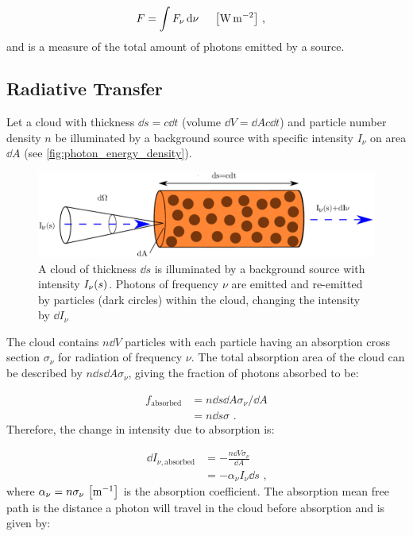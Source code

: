 \begin{equation}
	\begin{aligned}
		F&=\int F_\nu \dd{\nu}~\quad\qty[\si{\watt\per\meter\squared}]\text{ ,}
	\end{aligned}
\end{equation}
\noindent and is a measure of the total amount of photons emitted by a source.

\subsection{Radiative Transfer}

Let a cloud with thickness $\dd{s}=c\dd{t}$ (volume $\dd{V}=\dd{A}c\dd{t}$) and particle number density $n$ be illuminated by a background source with specific intensity $I_\nu$ on area $\dd{A}$ (see \autoref{fig:photon_energy_density}).

\begin{figure}[H]
	\centering
	\includegraphics[width=\textwidth]{06_Interstellar_Medium/Images/Theory/radiative_transfer.pdf}
	\caption{A cloud of thickness $\dd{s}$ is illuminated by a background source with intensity $I_\nu\qty(s)$. Photons of frequency $\nu$ are emitted and re-emitted by particles (dark circles) within the cloud, changing the intensity by $\dd{I_\nu}$}
	\label{fig:photon_energy_density}
\end{figure}
\noindent The cloud contains $n\dd{V}$ particles with each particle having an absorption cross section $\sigma_\nu$ for radiation of frequency $\nu$. The total absorption area of the cloud can be described by $n\dd{s}\dd{A}\sigma_\nu$, giving the fraction of photons absorbed to be:

\begin{equation}
    \begin{aligned}
        f_\text{absorbed}&=n\dd{s}\dd{A}\sigma_\nu/\dd{A} \\
        &=n\dd{s}\sigma \text{ .}
    \end{aligned}
\end{equation}
\noindent Therefore, the change in intensity due to absorption is:

\begin{equation}
    \begin{aligned}
        \dd{I_{\nu,\text{absorbed}}}&=- \frac{n\dd{V}\sigma_\nu}{\dd{A}} \\
        &= - \alpha_\nu I_\nu \dd{s}\text{ ,}
    \end{aligned}
\end{equation}
\noindent where $\alpha_\nu=n\sigma_\nu~\qty[\si{\per\meter}]$ is the absorption coefficient. The absorption mean free path is the distance a photon will travel in the cloud before absorption and is given by:

